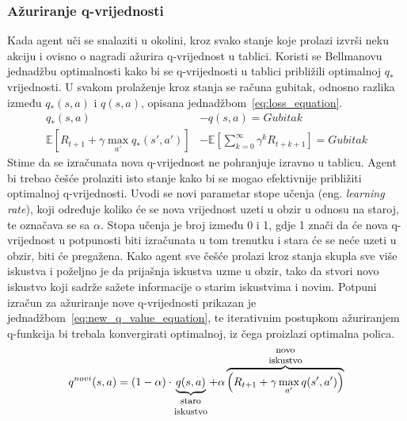 \subsubsection{Ažuriranje q-vrijednosti}
Kada agent uči se snalaziti u okolini, kroz svako stanje koje prolazi izvrši neku akciju i ovisno o nagradi ažurira q-vrijednost u tablici. Koristi se Bellmanovu jednadžbu optimalnosti kako bi se q-vrijednosti u tablici približili optimalnoj $q_*$ vrijednosti. U svakom prolaženje kroz stanja se računa gubitak, odnosno razlika između $q_*(s,a)$ i $q(s, a)$, opisana jednadžbom~\ref{eq:loss_equation}. 
\begin{equation}\label{eq:loss_equation}
\begin{split}
q_*(s, a) &- q(s, a) = Gubitak \\
\mathbb{E}\left[R_{t+1} + \gamma\max_{a'}q_*(s', a')\right] &- 
\mathbb{E}\left[\sum_{k=0}^{\infty}\gamma^kR_{t+k+1}\right] = Gubitak
\end{split}
\end{equation}
Stime da se izračunata nova q-vrijednost ne pohranjuje izravno u tablicu. Agent bi trebao češće prolaziti isto stanje kako bi se mogao efektivnije približiti optimalnoj q-vrijednosti. Uvodi se novi parametar stope učenja (eng. \textit{learning rate}), koji određuje koliko će se nova vrijednost uzeti u obzir u odnosu na staroj, te označava se sa  $\alpha$. Stopa učenja je broj između 0 i 1, gdje 1 znači da će nova q-vrijednost u potpunosti biti izračunata u tom trenutku i stara će se neće uzeti u obzir, biti će pregažena. Kako agent sve češće prolazi kroz stanja skupla sve više iskustva i poželjno je da prijašnja iskustva uzme u obzir, tako da stvori novo iskustvo koji sadrže sažete informacije o starim iskustvima i novim. Potpuni izračun za ažuriranje nove q-vrijednosti prikazan je jednadžbom~\ref{eq:new_q_value_equation}, te iterativnim postupkom ažuriranjem q-funkcija bi trebala konvergirati optimalnoj, iz čega proizlazi optimalna polica.
\begin{equation}\label{eq:new_q_value_equation}
q^{novi}(s, a) = (1 - \alpha) \cdot \underbrace{q(s, a)}_{\parbox{3em}{\footnotesize\centering staro iskustvo}} + \alpha
\overbrace{\left(R_{t+1} + \gamma\max_{a'}q(s', a')\right)}^{\parbox{3em}{\footnotesize\centering novo iskustvo}}
\end{equation}

